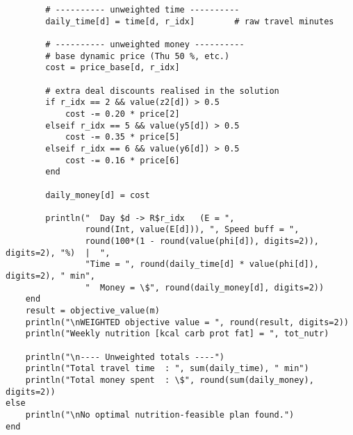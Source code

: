 \begin{verbatim}
        # ---------- unweighted time ----------
        daily_time[d] = time[d, r_idx]        # raw travel minutes

        # ---------- unweighted money ----------
        # base dynamic price (Thu 50 %, etc.)
        cost = price_base[d, r_idx]

        # extra deal discounts realised in the solution
        if r_idx == 2 && value(z2[d]) > 0.5
            cost -= 0.20 * price[2]
        elseif r_idx == 5 && value(y5[d]) > 0.5
            cost -= 0.35 * price[5]
        elseif r_idx == 6 && value(y6[d]) > 0.5
            cost -= 0.16 * price[6]
        end
        
        daily_money[d] = cost

        println("  Day $d -> R$r_idx   (E = ",
                round(Int, value(E[d])), ", Speed buff = ",
                round(100*(1 - round(value(phi[d]), digits=2)), digits=2), "%)  |  ",
                "Time = ", round(daily_time[d] * value(phi[d]), digits=2), " min",
                "  Money = \$", round(daily_money[d], digits=2))
    end
    result = objective_value(m)
    println("\nWEIGHTED objective value = ", round(result, digits=2))
    println("Weekly nutrition [kcal carb prot fat] = ", tot_nutr)

    println("\n---- Unweighted totals ----")
    println("Total travel time  : ", sum(daily_time), " min")
    println("Total money spent  : \$", round(sum(daily_money), digits=2))
else
    println("\nNo optimal nutrition‑feasible plan found.")
end

\end{verbatim}
